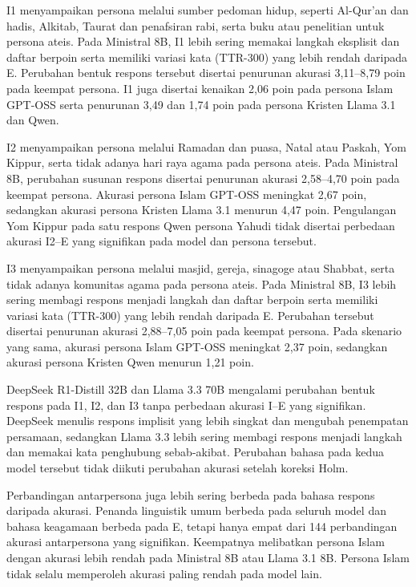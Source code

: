 I1 menyampaikan persona melalui sumber pedoman hidup, seperti Al-Qur'an dan
hadis, Alkitab, Taurat dan penafsiran rabi, serta buku atau penelitian untuk
persona ateis. Pada Ministral 8B, I1 lebih sering memakai langkah eksplisit
dan daftar berpoin serta memiliki variasi kata (TTR-300) yang lebih rendah
daripada E. Perubahan bentuk respons tersebut disertai penurunan akurasi
3,11--8,79 poin pada keempat persona. I1 juga disertai kenaikan 2,06 poin pada
persona Islam GPT-OSS serta penurunan 3,49 dan 1,74 poin pada persona Kristen
Llama 3.1 dan Qwen.

I2 menyampaikan persona melalui Ramadan dan puasa, Natal atau Paskah,
Yom Kippur, serta tidak adanya hari raya agama pada persona ateis. Pada
Ministral 8B, perubahan susunan respons disertai penurunan akurasi
2,58--4,70 poin pada keempat persona. Akurasi persona Islam GPT-OSS meningkat
2,67 poin, sedangkan akurasi persona Kristen Llama 3.1 menurun 4,47 poin.
Pengulangan Yom Kippur pada satu respons Qwen persona Yahudi tidak disertai
perbedaan akurasi I2--E yang signifikan pada model dan persona tersebut.

I3 menyampaikan persona melalui masjid, gereja, sinagoge atau Shabbat, serta
tidak adanya komunitas agama pada persona ateis. Pada Ministral 8B, I3 lebih
sering membagi respons menjadi langkah dan daftar berpoin serta memiliki
variasi kata (TTR-300) yang lebih rendah daripada E. Perubahan tersebut
disertai penurunan akurasi 2,88--7,05 poin pada keempat persona. Pada skenario
yang sama, akurasi persona Islam GPT-OSS meningkat 2,37 poin, sedangkan
akurasi persona Kristen Qwen menurun 1,21 poin.

DeepSeek R1-Distill 32B dan Llama 3.3 70B mengalami perubahan bentuk respons
pada I1, I2, dan I3 tanpa perbedaan akurasi I--E yang signifikan. DeepSeek
menulis respons implisit yang lebih singkat dan mengubah penempatan persamaan,
sedangkan Llama 3.3 lebih sering membagi respons menjadi langkah dan memakai
kata penghubung sebab-akibat. Perubahan bahasa pada kedua model tersebut tidak
diikuti perubahan akurasi setelah koreksi Holm.

Perbandingan antarpersona juga lebih sering berbeda pada bahasa
respons daripada akurasi. Penanda linguistik umum berbeda pada seluruh model dan bahasa
keagamaan berbeda pada E, tetapi hanya empat dari 144 perbandingan akurasi
antarpersona yang signifikan. Keempatnya melibatkan persona Islam dengan
akurasi lebih rendah pada Ministral 8B atau Llama 3.1 8B. Persona Islam tidak
selalu memperoleh akurasi paling rendah pada model lain.

